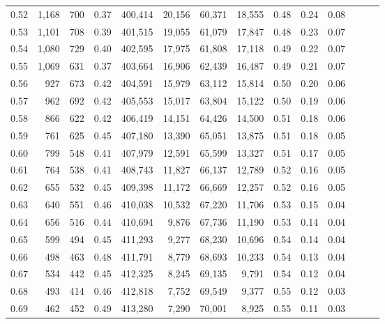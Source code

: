 \begin{tabular}{rrrrrrrrrrrrrr}
0.52 &   1,168 &    700 &  0.37 &  400,414 &   20,156 &  60,371 &  18,555 &  0.48 &  0.24 &      0.08 \\
0.53 &   1,101 &    708 &  0.39 &  401,515 &   19,055 &  61,079 &  17,847 &  0.48 &  0.23 &      0.07 \\
0.54 &   1,080 &    729 &  0.40 &  402,595 &   17,975 &  61,808 &  17,118 &  0.49 &  0.22 &      0.07 \\
0.55 &   1,069 &    631 &  0.37 &  403,664 &   16,906 &  62,439 &  16,487 &  0.49 &  0.21 &      0.07 \\
0.56 &     927 &    673 &  0.42 &  404,591 &   15,979 &  63,112 &  15,814 &  0.50 &  0.20 &      0.06 \\
0.57 &     962 &    692 &  0.42 &  405,553 &   15,017 &  63,804 &  15,122 &  0.50 &  0.19 &      0.06 \\
0.58 &     866 &    622 &  0.42 &  406,419 &   14,151 &  64,426 &  14,500 &  0.51 &  0.18 &      0.06 \\
0.59 &     761 &    625 &  0.45 &  407,180 &   13,390 &  65,051 &  13,875 &  0.51 &  0.18 &      0.05 \\
0.60 &     799 &    548 &  0.41 &  407,979 &   12,591 &  65,599 &  13,327 &  0.51 &  0.17 &      0.05 \\
0.61 &     764 &    538 &  0.41 &  408,743 &   11,827 &  66,137 &  12,789 &  0.52 &  0.16 &      0.05 \\
0.62 &     655 &    532 &  0.45 &  409,398 &   11,172 &  66,669 &  12,257 &  0.52 &  0.16 &      0.05 \\
0.63 &     640 &    551 &  0.46 &  410,038 &   10,532 &  67,220 &  11,706 &  0.53 &  0.15 &      0.04 \\
0.64 &     656 &    516 &  0.44 &  410,694 &    9,876 &  67,736 &  11,190 &  0.53 &  0.14 &      0.04 \\
0.65 &     599 &    494 &  0.45 &  411,293 &    9,277 &  68,230 &  10,696 &  0.54 &  0.14 &      0.04 \\
0.66 &     498 &    463 &  0.48 &  411,791 &    8,779 &  68,693 &  10,233 &  0.54 &  0.13 &      0.04 \\
0.67 &     534 &    442 &  0.45 &  412,325 &    8,245 &  69,135 &   9,791 &  0.54 &  0.12 &      0.04 \\
0.68 &     493 &    414 &  0.46 &  412,818 &    7,752 &  69,549 &   9,377 &  0.55 &  0.12 &      0.03 \\
0.69 &     462 &    452 &  0.49 &  413,280 &    7,290 &  70,001 &   8,925 &  0.55 &  0.11 &      0.03 \\

\end{tabular}
